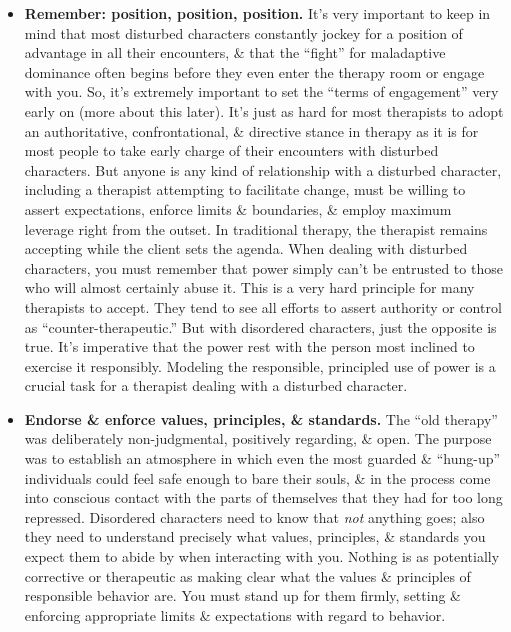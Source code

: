 \documentclass{article}
\numberwithin{equation}{section}
\begin{document}
\begin{itemize}
	\item \textbf{Remember: position, position, position.} It's very important to keep in mind that most disturbed characters constantly jockey for a position of advantage in all their encounters, \& that the ``fight'' for maladaptive dominance often begins before they even enter the therapy room or engage with you. So, it's extremely important to set the ``terms of engagement'' very early on (more about this later). It's just as hard for most therapists to adopt an authoritative, confrontational, \& directive stance in therapy as it is for most people to take early charge of their encounters with disturbed characters. But anyone is any kind of relationship with a disturbed character, including a therapist attempting to facilitate change, must be willing to assert expectations, enforce limits \& boundaries, \& employ maximum leverage right from the outset. In traditional therapy, the therapist remains accepting while the client sets the agenda. When dealing with disturbed characters, you must remember that power simply can't be entrusted to those who will almost certainly abuse it. This is a very hard principle for many therapists to accept. They tend to see all efforts to assert authority or control as ``counter-therapeutic.'' But with disordered characters, just the opposite is true. It's imperative that the power rest with the person most inclined to exercise it responsibly. Modeling the responsible, principled use of power is a crucial task for a therapist dealing with a disturbed character.
	\item \textbf{Endorse \& enforce values, principles, \& standards.} The ``old therapy'' was deliberately non-judgmental, positively regarding, \& open. The purpose was to establish an atmosphere in which even the most guarded \& ``hung-up'' individuals could feel safe enough to bare their souls, \& in the process come into conscious contact with the parts of themselves that they had for too long repressed. Disordered characters need to know that \textit{not} anything goes; also they need to understand precisely what values, principles, \& standards you expect them to abide by when interacting with you. Nothing is as potentially corrective or therapeutic as making clear what the values \& principles of responsible behavior are. You must stand up for them firmly, setting \& enforcing appropriate limits \& expectations with regard to behavior.

\end{itemize}
\end{document}
